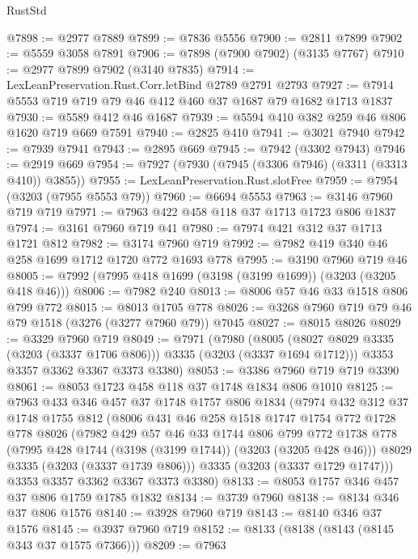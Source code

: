 \begin{lexlean}{RustStd}
\begin{coremodule}
@7898 := @2977 @7889
@7899 := @7836 @5556
@7900 := @2811 @7899
@7902 := @5559 @3058 @7891
@7906 := @7898 (@7900 @7902) (@3135 @7767)
@7910 := @2977 @7899 @7902 (@3140 @7835)
@7914 := LexLeanPreservation.Rust.Corr.letBind @2789 @2791 @2793
@7927 := @7914 @5553 @719 @719 @79 @46 @412 @460 @37 @1687 @79 @1682 @1713 @1837
@7930 := @5589 @412 @46 @1687
@7939 := @5594 @410 @382 @259 @46 @806 @1620 @719 @669 @7591
@7940 := @2825 @410
@7941 := @3021 @7940
@7942 := @7939 @7941
@7943 := @2895 @669
@7945 := @7942 (@3302 @7943)
@7946 := @2919 @669
@7954 := @7927 (@7930 (@7945 (@3306 @7946) (@3311 (@3313 @410)) @3855))
@7955 := LexLeanPreservation.Rust.slotFree
@7959 := @7954 (@3203 (@7955 @5553 @79))
@7960 := @6694 @5553
@7963 := @3146 @7960 @719 @719
@7971 := @7963 @422 @458 @118 @37 @1713 @1723 @806 @1837
@7974 := @3161 @7960 @719 @41
@7980 := @7974 @421 @312 @37 @1713 @1721 @812
@7982 := @3174 @7960 @719
@7992 := @7982 @419 @340 @46 @258 @1699 @1712 @1720 @772 @1693 @778
@7995 := @3190 @7960 @719 @46
@8005 := @7992 (@7995 @418 @1699 (@3198 (@3199 @1699)) (@3203 (@3205 @418 @46)))
@8006 := @7982 @240
@8013 := @8006 @57 @46 @33 @1518 @806 @799 @772
@8015 := @8013 @1705 @778
@8026 := @3268 @7960 @719 @79 @46 @79 @1518 (@3276 (@3277 @7960 @79)) @7045
@8027 := @8015 @8026
@8029 := @3329 @7960 @719
@8049 := @7971
    (@7980
      (@8005 (@8027 @8029 @3335 (@3203 (@3337 @1706 @806))) @3335 (@3203 (@3337 @1694 @1712)))
      @3353
      @3357
      @3362
      @3367
      @3373
      @3380)
@8053 := @3386 @7960 @719 @719 @3390
@8061 := @8053 @1723 @458 @118 @37 @1748 @1834 @806 @1010
@8125 := @7963
    @433
    @346
    @457
    @37
    @1748
    @1757
    @806
    @1834
    (@7974
      @432
      @312
      @37
      @1748
      @1755
      @812
      (@8006
        @431
        @46
        @258
        @1518
        @1747
        @1754
        @772
        @1728
        @778
        @8026
        (@7982
          @429
          @57
          @46
          @33
          @1744
          @806
          @799
          @772
          @1738
          @778
          (@7995 @428 @1744 (@3198 (@3199 @1744)) (@3203 (@3205 @428 @46)))
          @8029
          @3335
          (@3203 (@3337 @1739 @806)))
        @3335
        (@3203 (@3337 @1729 @1747)))
      @3353
      @3357
      @3362
      @3367
      @3373
      @3380)
@8133 := @8053 @1757 @346 @457 @37 @806 @1759 @1785 @1832
@8134 := @3739 @7960
@8138 := @8134 @346 @37 @806 @1576
@8140 := @3928 @7960 @719
@8143 := @8140 @346 @37 @1576
@8145 := @3937 @7960 @719
@8152 := @8133 (@8138 (@8143 (@8145 @343 @37 @1575 @7366)))
@8209 := @7963

\end{coremodule}
\end{lexlean}

